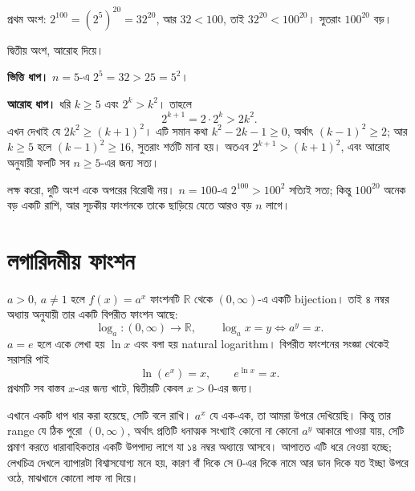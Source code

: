 \documentclass[11pt]{article}
\begin{document}
\begin{sol}
প্রথম অংশ: $2^{100} = \left( 2^{5} \right)^{20} = 32^{20}$, আর $32 < 100$, তাই
$32^{20} < 100^{20}$। সুতরাং $100^{20}$ বড়।

দ্বিতীয় অংশ, আরোহ দিয়ে।

\textbf{ভিত্তি ধাপ।} $n = 5$-এ $2^{5} = 32 > 25 = 5^{2}$।

\textbf{আরোহ ধাপ।} ধরি $k \geq 5$ এবং $2^{k} > k^{2}$। তাহলে
\[
  2^{k+1} = 2 \cdot 2^{k} > 2k^{2} .
\]
এখন দেখাই যে $2k^{2} \geq (k+1)^{2}$। এটি সমান কথা $k^{2} - 2k - 1 \geq 0$,
অর্থাৎ $(k-1)^{2} \geq 2$; আর $k \geq 5$ হলে $(k-1)^{2} \geq 16$, সুতরাং শর্তটি
মানা হয়। অতএব $2^{k+1} > (k+1)^{2}$, এবং আরোহ অনুযায়ী ফলটি সব $n \geq 5$-এর
জন্য সত্য।

লক্ষ করো, দুটি অংশ একে অপরের বিরোধী নয়। $n = 100$-এ $2^{100} > 100^{2}$ সত্যিই
সত্য; কিন্তু $100^{20}$ অনেক বড় একটি রাশি, আর সূচকীয় ফাংশনকে তাকে ছাড়িয়ে যেতে
আরও বড় $n$ লাগে।
\end{sol}

\section{লগারিদমীয় ফাংশন}

\begin{idea}[লগারিদম একটি বিপরীত ফাংশন]
$a > 0$, $a \neq 1$ হলে $f(x) = a^{x}$ ফাংশনটি $\mathbb{R}$ থেকে $(0,\infty)$-এ
একটি bijection। তাই ৪ নম্বর অধ্যায় অনুযায়ী তার একটি বিপরীত ফাংশন আছে:
\[
  \log_{a} \colon (0,\infty) \to \mathbb{R}, \qquad
  \log_{a} x = y \iff a^{y} = x .
\]
$a = e$ হলে একে লেখা হয় $\ln x$ এবং বলা হয় natural logarithm। বিপরীত ফাংশনের
সংজ্ঞা থেকেই সরাসরি পাই
\[
  \ln \left( e^{x} \right) = x , \qquad e^{\ln x} = x .
\]
প্রথমটি সব বাস্তব $x$-এর জন্য খাটে, দ্বিতীয়টি কেবল $x > 0$-এর জন্য।
\end{idea}

এখানে একটি ধাপ ধার করা হয়েছে, সেটি বলে রাখি। $a^{x}$ যে এক-এক, তা আমরা উপরে
দেখিয়েছি। কিন্তু তার range যে ঠিক পুরো $(0,\infty)$, অর্থাৎ প্রতিটি ধনাত্মক
সংখ্যাই কোনো না কোনো $a^{y}$ আকারে পাওয়া যায়, সেটি প্রমাণ করতে ধারাবাহিকতার
একটি উপপাদ্য লাগে যা ১৪ নম্বর অধ্যায়ে আসবে। আপাতত এটি ধরে নেওয়া হচ্ছে;
লেখচিত্র দেখলে ব্যাপারটা বিশ্বাসযোগ্য মনে হয়, কারণ বাঁ দিকে সে $0$-এর দিকে নামে
আর ডান দিকে যত ইচ্ছা উপরে ওঠে, মাঝখানে কোনো লাফ না দিয়ে।

\begin{center}
\end{center}
\end{document}
